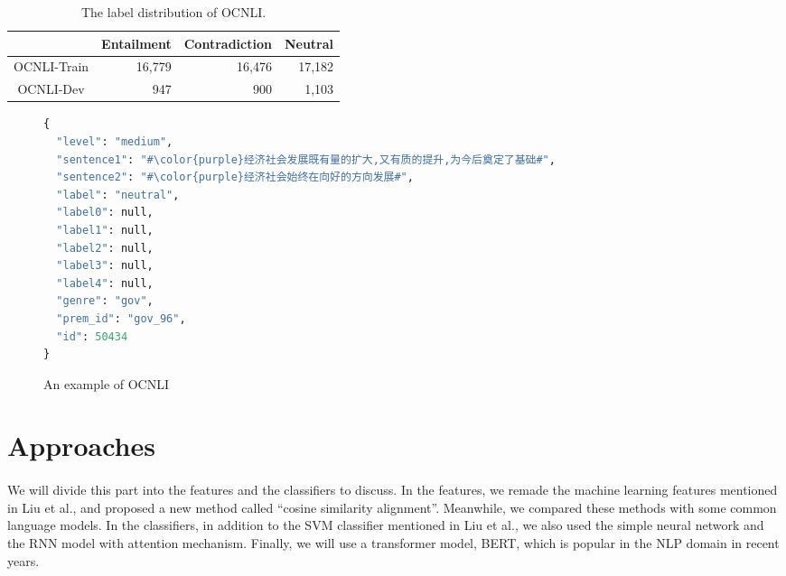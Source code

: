\documentclass[12pt]{article}
\begin{document}
\begin{CJK*}{UTF8}{bkai}
\begin{spacing}{1.77}
\begin{table}[ht!]
  \centering
  \begin{tabular}{|c|r|r|r|}
  \hline
              & Entailment & Contradiction & Neutral \\ \hline
  OCNLI-Train & 16,779     & 16,476        & 17,182  \\ \hline
  OCNLI-Dev   & 947        & 900           & 1,103   \\ \hline
  \end{tabular}
  \caption{The label distribution of OCNLI.}
\end{table}

\begin{figure}
\caption{An example of OCNLI}
\begin{minipage}{\linewidth}
\begin{CJK*}{UTF8}{gbsn}
\begin{lstlisting}[language=Python, escapechar=\#]
{
  "level": "medium",
  "sentence1": "#\color{purple}经济社会发展既有量的扩大,又有质的提升,为今后奠定了基础#",
  "sentence2": "#\color{purple}经济社会始终在向好的方向发展#",
  "label": "neutral",
  "label0": null,
  "label1": null,
  "label2": null,
  "label3": null,
  "label4": null,
  "genre": "gov",
  "prem_id": "gov_96",
  "id": 50434
}
\end{lstlisting}
\end{CJK*}
\end{minipage}
\end{figure}

\section{Approaches} \label{section:approaches}
\paragraph{}
We will divide this part into the features and the classifiers to discuss. In the features, we remade the machine learning features mentioned in Liu et al., and proposed a new method called ``cosine similarity alignment''. Meanwhile, we compared these methods with some common language models. In the classifiers, in addition to the SVM classifier mentioned in Liu et al., we also used the simple neural network and the RNN model with attention mechanism. Finally, we will use a transformer model, BERT, which is popular in the NLP domain in recent years.


\end{spacing}
\end{CJK*}
\end{document}
